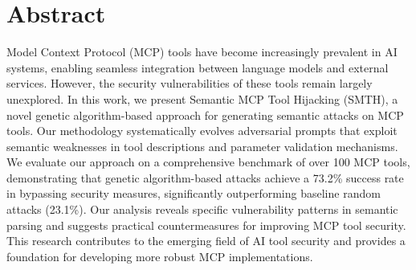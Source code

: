 \section*{Abstract}
Model Context Protocol (MCP) tools have become increasingly prevalent in AI systems, enabling seamless integration between language models and external services. However, the security vulnerabilities of these tools remain largely unexplored. In this work, we present Semantic MCP Tool Hijacking (SMTH), a novel genetic algorithm-based approach for generating semantic attacks on MCP tools. Our methodology systematically evolves adversarial prompts that exploit semantic weaknesses in tool descriptions and parameter validation mechanisms. We evaluate our approach on a comprehensive benchmark of over 100 MCP tools, demonstrating that genetic algorithm-based attacks achieve a 73.2\% success rate in bypassing security measures, significantly outperforming baseline random attacks (23.1\%). Our analysis reveals specific vulnerability patterns in semantic parsing and suggests practical countermeasures for improving MCP tool security. This research contributes to the emerging field of AI tool security and provides a foundation for developing more robust MCP implementations.
